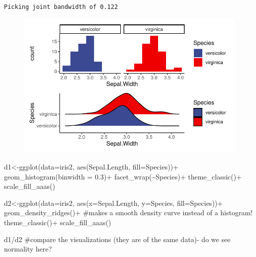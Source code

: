 \documentclass[
  letterpaper,
  DIV=11,
  numbers=noendperiod]{scrartcl}
\newenvironment{Shaded}{\begin{snugshade}}{\end{snugshade}}
\newcommand{\AttributeTok}[1]{\textcolor[rgb]{0.40,0.45,0.13}{#1}}
\newcommand{\CommentTok}[1]{\textcolor[rgb]{0.37,0.37,0.37}{#1}}
\newcommand{\FloatTok}[1]{\textcolor[rgb]{0.68,0.00,0.00}{#1}}
\newcommand{\FunctionTok}[1]{\textcolor[rgb]{0.28,0.35,0.67}{#1}}
\newcommand{\NormalTok}[1]{\textcolor[rgb]{0.00,0.23,0.31}{#1}}
\newcommand{\OtherTok}[1]{\textcolor[rgb]{0.00,0.23,0.31}{#1}}
\newcommand{\SpecialCharTok}[1]{\textcolor[rgb]{0.37,0.37,0.37}{#1}}
\begin{document}
\begin{verbatim}
Picking joint bandwidth of 0.122
\end{verbatim}

\begin{figure}[H]

{\centering \includegraphics{t_test_files/figure-pdf/unnamed-chunk-7-1.pdf}

}

\end{figure}

\begin{Shaded}
\begin{Highlighting}[]
\NormalTok{d1}\OtherTok{\textless{}{-}}\FunctionTok{ggplot}\NormalTok{(}\AttributeTok{data=}\NormalTok{iris2, }\FunctionTok{aes}\NormalTok{(Sepal.Length, }\AttributeTok{fill=}\NormalTok{Species))}\SpecialCharTok{+}
  \FunctionTok{geom\_histogram}\NormalTok{(}\AttributeTok{binwidth =} \FloatTok{0.3}\NormalTok{)}\SpecialCharTok{+} 
  \FunctionTok{facet\_wrap}\NormalTok{(}\SpecialCharTok{\textasciitilde{}}\NormalTok{Species)}\SpecialCharTok{+}
  \FunctionTok{theme\_classic}\NormalTok{()}\SpecialCharTok{+}
  \FunctionTok{scale\_fill\_aaas}\NormalTok{()}

\NormalTok{d2}\OtherTok{\textless{}{-}}\FunctionTok{ggplot}\NormalTok{(}\AttributeTok{data=}\NormalTok{iris2, }\FunctionTok{aes}\NormalTok{(}\AttributeTok{x=}\NormalTok{Sepal.Length, }\AttributeTok{y=}\NormalTok{Species, }\AttributeTok{fill=}\NormalTok{Species))}\SpecialCharTok{+}
  \FunctionTok{geom\_density\_ridges}\NormalTok{()}\SpecialCharTok{+} \CommentTok{\#makes a smooth density curve instead of a histogram!}
  \FunctionTok{theme\_classic}\NormalTok{()}\SpecialCharTok{+}
  \FunctionTok{scale\_fill\_aaas}\NormalTok{()}

\NormalTok{d1}\SpecialCharTok{/}\NormalTok{d2 }\CommentTok{\#compare the visualizations (they are of the same data){-} do we see normality here?}
\end{Highlighting}
\end{Shaded}
\end{document}
